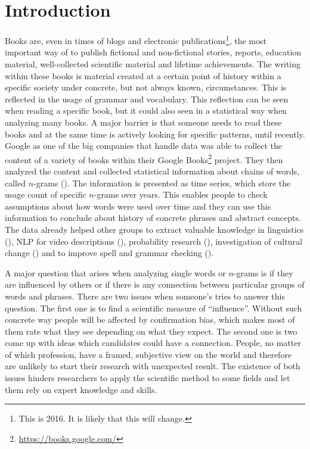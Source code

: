 \chapter{Introduction}
\label{ch:Introduction}

Books are, even in times of blogs and electronic publications\footnote{This is 2016. It is likely that this will change.}, the most important way of to publish fictional and non-fictional stories, reports, education material, well-collected scientific material and lifetime achievements. The writing within these books is material created at a certain point of history within a specific society under concrete, but not always known, circumstances. This is reflected in the usage of grammar and vocabulary. This reflection can be seen when reading a specific book, but it could also seen in a statistical way when analyzing many books. A major barrier is that someone needs to read these books and at the same time is actively looking for specific patterns, until recently. Google as one of the big companies that handle data was able to collect the content of a variety of books within their Google Books\footnote{\url{https://books.google.com/}} project. They then analyzed the content and collected statistical information about chains of words, called $n$-grams (\cite{Google_nGrams}). The information is presented as time series, which store the usage count of specific $n$-grams over years. This enables people to check assumptions about how words were used over time and they can use this information to conclude about history of concrete phrases and abstract concepts. The data already helped other groups to extract valuable knowledge in linguistics (\cite{others1,others5,others7}), NLP for video descriptions (\cite{others2}), probability research (\cite{others3,others6}), investigation of cultural change (\cite{others4}) and to improve spell and grammar checking (\cite{languagetool}).

A major question that arises when analyzing single words or $n$-grams is if they are influenced by others or if there is any connection between particular groups of words and phrases. There are two issues when someone's tries to answer this question. The first one is to find a scientific measure of \enquote{influence}. Without such concrete way people will be affected by confirmation bias, which makes most of them rate what they see depending on what they expect. The second one is two come up with ideas which candidates could have a connection. People, no matter of which profession, have a framed, subjective view on the world and therefore are unlikely to start their research with unexpected result. The existence of both issues hinders researchers to apply the scientific method to some fields and let them rely on expert knowledge and skills.

